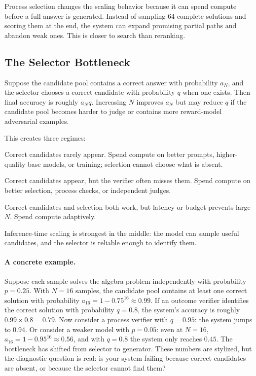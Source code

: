 Process selection changes the scaling behavior because it can spend compute before a full answer is generated. Instead of sampling 64 complete solutions and scoring them at the end, the system can expand promising partial paths and abandon weak ones. This is closer to search than reranking.

\subsection{The Selector Bottleneck}

Suppose the candidate pool contains a correct answer with probability $a_N$, and the selector chooses a correct candidate with probability $q$ when one exists. Then final accuracy is roughly $a_N q$. Increasing $N$ improves $a_N$ but may reduce $q$ if the candidate pool becomes harder to judge or contains more reward-model adversarial examples.

This creates three regimes:

\begin{description}[leftmargin=1.5em]
  \item[Generator-limited.] Correct candidates rarely appear. Spend compute on better prompts, higher-quality base models, or training; selection cannot choose what is absent.
  \item[Selector-limited.] Correct candidates appear, but the verifier often misses them. Spend compute on better selection, process checks, or independent judges.
  \item[Cost-limited.] Correct candidates and selection both work, but latency or budget prevents large $N$. Spend compute adaptively.
\end{description}

Inference-time scaling is strongest in the middle: the model can sample useful candidates, and the selector is reliable enough to identify them.

\paragraph{A concrete example.} Suppose each sample solves the algebra problem independently with probability $p = 0.25$. With $N=16$ samples, the candidate pool contains at least one correct solution with probability $a_{16} = 1 - 0.75^{16} \approx 0.99$. If an outcome verifier identifies the correct solution with probability $q = 0.8$, the system's accuracy is roughly $0.99 \times 0.8 = 0.79$. Now consider a process verifier with $q = 0.95$: the system jumps to $0.94$. Or consider a weaker model with $p = 0.05$: even at $N = 16$, $a_{16} = 1 - 0.95^{16} \approx 0.56$, and with $q = 0.8$ the system only reaches $0.45$. The bottleneck has shifted from selector to generator. These numbers are stylized, but the diagnostic question is real: is your system failing because correct candidates are absent, or because the selector cannot find them?


